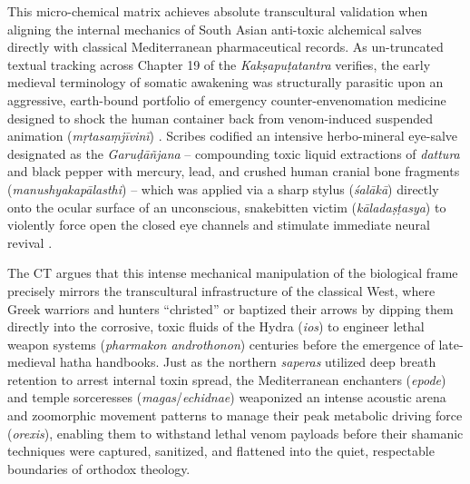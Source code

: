\documentclass[11pt,twoside,letterpaper]{article}
\begin{document}
This micro-chemical matrix achieves absolute transcultural validation when aligning the internal mechanics of South Asian anti-toxic alchemical salves directly with classical Mediterranean pharmaceutical records. As un-truncated textual tracking across Chapter 19 of the \textit{Kakṣapuṭatantra} verifies, the early medieval terminology of somatic awakening was structurally parasitic upon an aggressive, earth-bound portfolio of emergency counter-envenomation medicine designed to shock the human container back from venom-induced suspended animation (\textit{mṛtasaṃjīvinī}) \citep{Wujastyk2025}. Scribes codified an intensive herbo-mineral eye-salve designated as the \textit{Garuḍāñjana} -- compounding toxic liquid extractions of \textit{dattura} and black pepper with mercury, lead, and crushed human cranial bone fragments (\textit{manushyakapālasthi}) -- which was applied via a sharp stylus (\textit{śalākā}) directly onto the ocular surface of an unconscious, snakebitten victim (\textit{kāladaṣṭasya}) to violently force open the closed eye channels and stimulate immediate neural revival \citep{Mallinson2007, Wujastyk2025}. 

The CT argues that this intense mechanical manipulation of the biological frame precisely mirrors the transcultural infrastructure of the classical West, where Greek warriors and hunters ``christed'' or baptized their arrows by dipping them directly into the corrosive, toxic fluids of the Hydra (\textit{ios}) to engineer lethal weapon systems (\textit{pharmakon androthonon}) centuries before the emergence of late-medieval hatha handbooks. Just as the northern \textit{saperas} utilized deep breath retention to arrest internal toxin spread, the Mediterranean enchanters (\textit{epode}) and temple sorceresses (\textit{magas}/\textit{echidnae}) weaponized an intense acoustic arena and zoomorphic movement patterns to manage their peak metabolic driving force (\textit{orexis}), enabling them to withstand lethal venom payloads before their shamanic techniques were captured, sanitized, and flattened into the quiet, respectable boundaries of orthodox theology.
\end{document}
